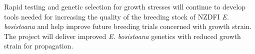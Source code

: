 Rapid testing and genetic selection for growth stresses will continue to develop
tools needed for increasing the quality of the breeding stock of NZDFI
\textit{E. bosistoana} and help improve future breeding trials concerned with
growth strain. The project will deliver improved \textit{E. bosistoana} genetics with
reduced growth strain for propagation.